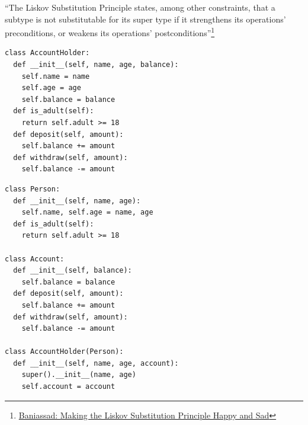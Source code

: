 \documentclass[calcdimensions,landscape,letterpaper]{powersem}
\newcommand{\thecurrentheading}{}
\newcommand{\heading}[1]{\renewcommand{\thecurrentheading}{#1}}
\begin{document}
\begin{slide}
  \heading{Liskov-Substitution - Contracts}
  \begin{center}
    ``The Liskov Substitution Principle states, among other constraints, that a subtype is not substitutable for its super type
    if it strengthens its operations' preconditions, or weakens its operations' postconditions''\footnote{\href{https://www.cs.ubc.ca/~ebani/papers/LiskofHappySad_ICSE-SEET_2018.pdf}{Baniassad: Making the Liskov Substitution Principle Happy and Sad}}\bigskip\\
  \end{center}
\end{slide}

\begin{slide}
  \heading{Interface Segregation - Before}
  \begin{center}
    \begin{verbatim}
class AccountHolder:
  def __init__(self, name, age, balance):
    self.name = name
    self.age = age
    self.balance = balance
  def is_adult(self):
    return self.adult >= 18
  def deposit(self, amount):
    self.balance += amount
  def withdraw(self, amount):
    self.balance -= amount
    \end{verbatim}
  \end{center}
\end{slide}

\begin{slide}
  \heading{Interface Segregation - After}
  \begin{center}
    \begin{verbatim}
class Person:
  def __init__(self, name, age):
    self.name, self.age = name, age
  def is_adult(self):
    return self.adult >= 18

class Account:
  def __init__(self, balance):
    self.balance = balance
  def deposit(self, amount):
    self.balance += amount
  def withdraw(self, amount):
    self.balance -= amount

class AccountHolder(Person):
  def __init__(self, name, age, account):
    super().__init__(name, age)
    self.account = account
    \end{verbatim}
  \end{center}
\end{slide}
\end{document}
